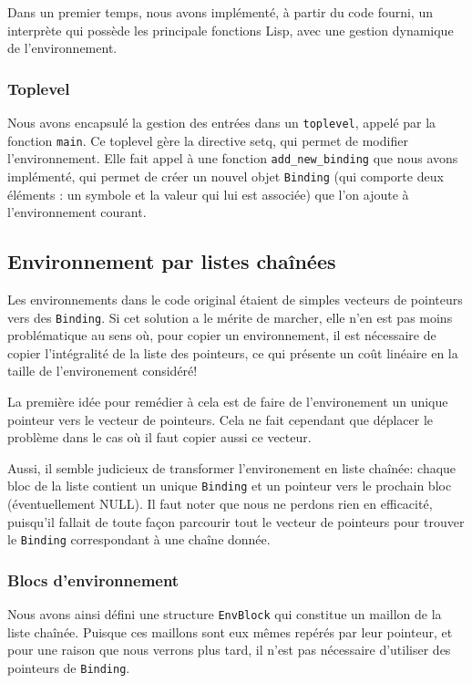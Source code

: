 \documentclass[a4paper,11pt]{article}
\begin{document}
Dans un premier temps, nous avons implémenté, à partir du code fourni, un interprète qui possède les principale fonctions Lisp, avec une gestion dynamique de l'environnement.

\subsubsection{Toplevel}

  Nous avons encapsulé la gestion des entrées dans un \texttt{toplevel}, 
 appelé par la fonction \texttt{main}. Ce toplevel gère la directive setq, qui
 permet de modifier l'environnement. 
 Elle fait appel à une fonction \texttt{add\_new\_binding} que nous avons
 implémenté, qui permet de créer un nouvel objet
  \texttt{Binding} (qui comporte deux éléments : un
 symbole et la valeur qui lui est associée) que l'on ajoute à l'environnement courant.

\subsection{Environnement par listes chaînées}

Les environnements dans le code original étaient de simples vecteurs de pointeurs
vers des \texttt{Binding}. Si cet solution a le mérite de marcher, elle n'en est
pas moins problématique au sens où, pour copier un environnement, il est
nécessaire de copier l'intégralité de la liste des pointeurs, ce qui présente un
coût linéaire en la taille de l'environement considéré!

La première idée pour remédier à cela est de faire de l'environement un unique
pointeur vers le vecteur de pointeurs. Cela ne fait cependant que déplacer le
problème dans le cas où il faut copier aussi ce vecteur.

Aussi, il semble judicieux de transformer l'environement en liste chaînée:
chaque bloc de la liste contient un unique \texttt{Binding} et un pointeur vers
le prochain bloc (éventuellement NULL). Il faut noter que nous ne perdons rien
en efficacité, puisqu'il fallait de toute façon parcourir tout le vecteur de
pointeurs pour trouver le \texttt{Binding} correspondant à une chaîne donnée.

\subsubsection{Blocs d’environnement}

Nous avons ainsi défini une structure \texttt{EnvBlock} qui constitue un maillon
de la liste chaînée. Puisque ces maillons sont eux mêmes repérés par leur
pointeur, et pour une raison que nous verrons plus tard, il n'est pas nécessaire
d'utiliser des pointeurs de \texttt{Binding}.
\end{document}
